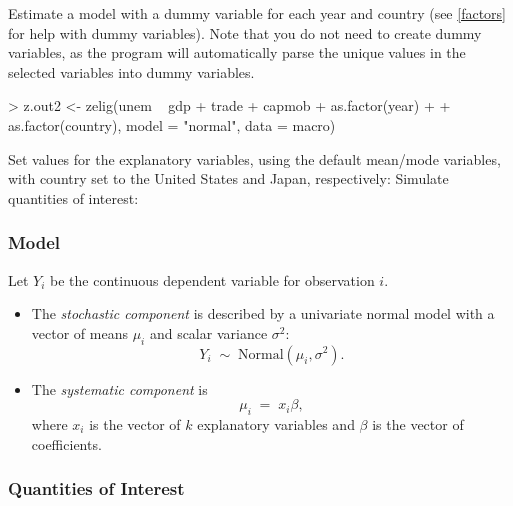 \documentclass{article}
\begin{document}
\begin{enumerate}
Estimate a model with a dummy variable for each year and country (see
\ref{factors} for help with dummy variables).  Note that you do not
need to create dummy variables, as the program will automatically
parse the unique values in the selected variables into dummy
variables.    
\begin{Schunk}
\begin{Sinput}
> z.out2 <- zelig(unem ~ gdp + trade + capmob + as.factor(year) + 
+     as.factor(country), model = "normal", data = macro)
\end{Sinput}
\end{Schunk}
Set values for the explanatory variables, using the default mean/mode
variables, with country set to the United States and Japan,
respectively: 
Simulate quantities of interest:  
\begin{center}
\end{center}
\end{enumerate}

\subsubsection{Model}
Let $Y_i$ be the continuous dependent variable for observation $i$.
\begin{itemize}
\item The \emph{stochastic component} is described by a univariate normal
  model with a vector of means $\mu_i$ and scalar variance $\sigma^2$:
  \begin{equation*}
    Y_i \; \sim \; \textrm{Normal}(\mu_i, \sigma^2). 
  \end{equation*}

\item The \emph{systematic component} is 
  \begin{equation*}
    \mu_i \;= \; x_i \beta,
  \end{equation*}
  where $x_i$ is the vector of $k$ explanatory variables and $\beta$ is
  the vector of coefficients.
\end{itemize}


\subsubsection{Quantities of Interest}
\end{document}
